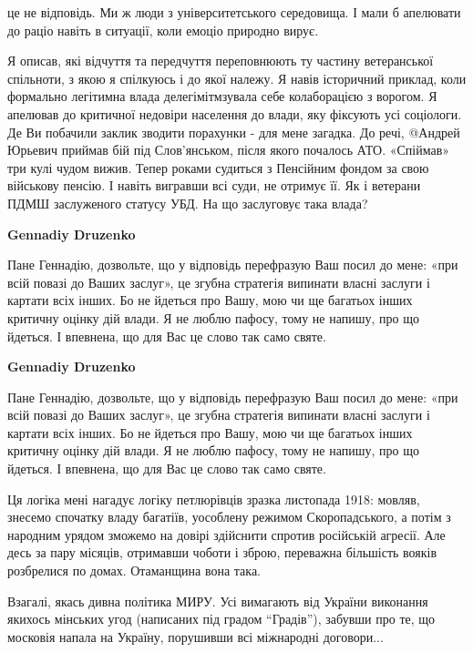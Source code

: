 \begin{itemize}
\begin{itemize}
це не відповідь. Ми ж люди з університетського середовища. І мали б апелювати
до раціо навіть в ситуації, коли емоціо природно вирує.

Я описав, які відчуття та передчуття переповнюють ту частину ветеранської
спільноти, з якою я спілкуюсь і до якої належу. Я навів історичний приклад,
коли формально легітимна влада делегімітмзувала себе колаборацією з ворогом. Я
апелював до критичної недовіри населення до влади, яку фіксують усі соціологи.
Де Ви побачили заклик зводити порахунки - для мене загадка. До речі, @Андрей
Юрьевич приймав бій під Слов’янськом, після якого почалось АТО. «Спіймав» три
кулі чудом вижив. Тепер роками судиться з Пенсійним фондом за свою військову
пенсію. І навіть вигравши всі суди, не отримує її. Як і ветерани ПДМШ
заслуженого статусу УБД. На що заслуговує така влада?

\textbf{Gennadiy Druzenko} 

Пане Геннадію, дозвольте, що у відповідь перефразую Ваш посил до мене: «при
всій повазі до Ваших заслуг», це згубна стратегія випинати власні заслуги і
картати всіх інших. Бо не йдеться про Вашу, мою чи ще багатьох інших критичну
оцінку дій влади. Я не люблю пафосу, тому не напишу, про що йдеться. І
впевнена, що для Вас це слово так само святе.

\textbf{Gennadiy Druzenko} 

Пане Геннадію, дозвольте, що у відповідь перефразую Ваш посил до мене: «при
всій повазі до Ваших заслуг», це згубна стратегія випинати власні заслуги і
картати всіх інших. Бо не йдеться про Вашу, мою чи ще багатьох інших критичну
оцінку дій влади. Я не люблю пафосу, тому не напишу, про що йдеться. І
впевнена, що для Вас це слово так само святе.


\end{itemize} %


Ця логіка мені нагадує логіку петлюрівців зразка листопада 1918: мовляв,
знесемо спочатку владу багатіїв, уособлену режимом Скоропадського, а потім з
народним урядом зможемо на довірі здійснити спротив російській агресії. Але
десь за пару місяців, отримавши чоботи і зброю, переважна більшість вояків
розбрелися по домах. Отаманщина вона така.


Взагалі, якась дивна політика МИРУ. Усі вимагають від України виконання якихось
мінських угод (написаних під градом \enquote{Градів}), забувши про те, що московія напала
на Україну, порушивши всі міжнародні договори...


\end{itemize}
